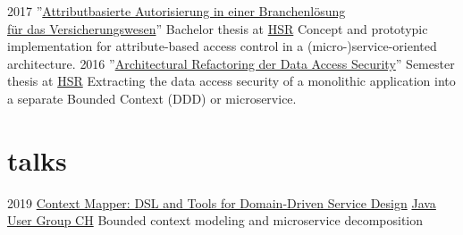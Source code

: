 \documentclass[]{cv-style}
\begin{document}
\begin{entrylist}
\entry
{2017}
{''\href{https://eprints.hsr.ch/602/}{Attributbasierte Autorisierung in einer Branchenlösung\\für das Versicherungswesen}''}
{Bachelor thesis at \href{https://www.hsr.ch}{HSR}}
{Concept and prototypic implementation for attribute-based access control in a (micro-)service-oriented architecture.}
\entry
{2016}
{''\href{https://eprints.hsr.ch/564/}{Architectural Refactoring der Data Access Security}''}
{Semester thesis at \href{https://www.hsr.ch}{HSR}}
{Extracting the data access security of a monolithic application into a separate Bounded Context (DDD) or microservice.}
\end{entrylist}


\section{talks}

\begin{entrylist}
\entry
{2019}
{\href{https://www.jug.ch/html/events/2019/context_mapper.html}{Context Mapper: DSL and Tools for Domain-Driven Service Design}}
{\href{https://www.jug.ch/}{Java User Group CH}}
{Bounded context modeling and microservice decomposition}
\end{entrylist}
\end{document}
